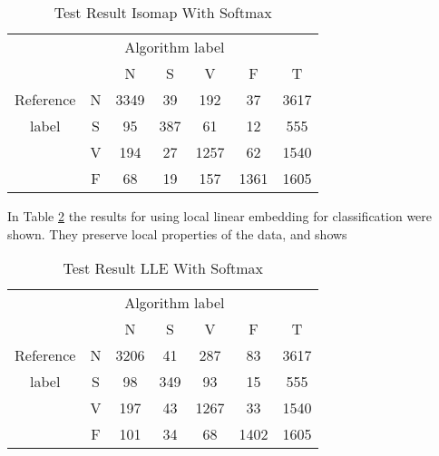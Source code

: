 \documentclass[journal]{IEEEtran}
\begin{document}



\begin{table}[!htbp]
\begin{center}
\begin{threeparttable}
\caption{Test Result Isomap With Softmax}
\label{isomap}
\begin{tabular}{ccccccc}
\hline
\multicolumn{5}{r}{Algorithm label} \\
\cline{3-6}
		&  & N & S      & V    & F       & T\\
\hline
 Reference & N & 3349 &  39  &  192   & 37   &  3617 \\
	label  & S &  95    & 387  &   61   & 12    &  555\\
		   & V &  194    & 27    & 1257 & 62    &  1540\\
		   & F &  68    & 19    & 157    & 1361  &  1605\\		
\hline
\end{tabular}

\end{threeparttable}
\end{center}
\end{table}




In Table \ref{LLE} the results for using local linear embedding for classification were shown. They preserve local properties of the data, and shows 

\begin{table}[!htbp]
\begin{center}
\begin{threeparttable}
\caption{Test Result LLE With Softmax}
\label{LLE}
\begin{tabular}{ccccccc}
\hline
\multicolumn{5}{r}{Algorithm label} \\
\cline{3-6}
		&  & N & S      & V    & F       & T\\
\hline
 Reference & N & 3206 &  41 &  287   & 83    &  3617 \\
	label  & S &  98    & 349  &  93   & 15    &  555\\
		   & V &  197    & 43    &  1267 & 33    &  1540\\
		   & F &  101    & 34    & 68   & 1402   &  1605\\		
\hline
\end{tabular}

\end{threeparttable}
\end{center}
\end{table}
\end{document}
